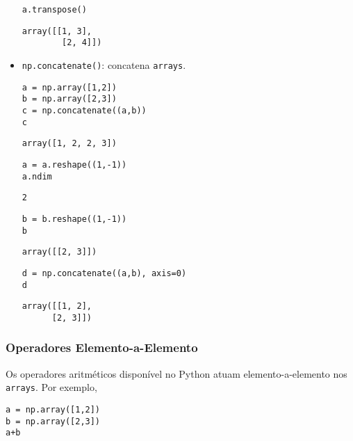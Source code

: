 \documentclass[a4paper,10pt,twoside]{article}
\begin{document}
\begin{itemize}
\begin{lstlisting}
a.transpose()
\end{lstlisting}

\begin{verbatim}
array([[1, 3],
        [2, 4]])
\end{verbatim}

\item \texttt{np.concatenate()}: concatena \texttt{arrays}.

\begin{lstlisting}
a = np.array([1,2])
b = np.array([2,3])
c = np.concatenate((a,b))
c
\end{lstlisting}

\begin{verbatim}
array([1, 2, 2, 3])
\end{verbatim}

\begin{lstlisting}
a = a.reshape((1,-1))
a.ndim  
\end{lstlisting}

\begin{verbatim}
2
\end{verbatim}

\begin{lstlisting}
b = b.reshape((1,-1))
b
\end{lstlisting}

\begin{verbatim}
array([[2, 3]])
\end{verbatim}

\begin{lstlisting}
d = np.concatenate((a,b), axis=0)
d
\end{lstlisting}

\begin{verbatim}
array([[1, 2],
      [2, 3]])
\end{verbatim}

  \end{itemize}

\subsubsection{Operadores Elemento-a-Elemento}\label{subsubsection:ope-a-e}

Os operadores aritméticos disponível no Python atuam elemento-a-elemento nos \texttt{arrays}. Por exemplo,

\begin{lstlisting}
a = np.array([1,2])
b = np.array([2,3])
a+b
\end{lstlisting}
\end{document}
